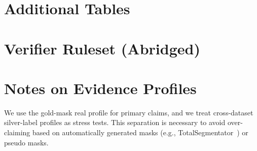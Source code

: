 \section{Additional Tables}








\section{Verifier Ruleset (Abridged)}


\section{Notes on Evidence Profiles}
We use the gold-mask real profile for primary claims, and we treat cross-dataset silver-label profiles as stress tests.
This separation is necessary to avoid over-claiming based on automatically generated masks (e.g., TotalSegmentator~\citep{wasserthal2023totalsegmentator}) or pseudo masks.
